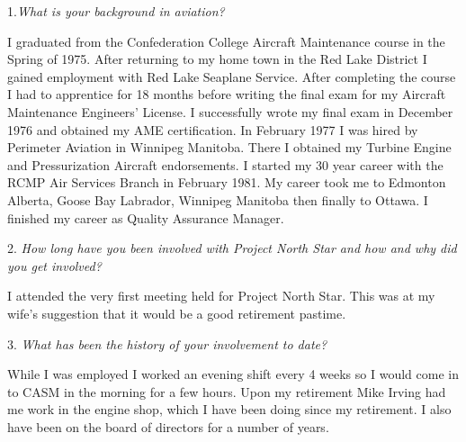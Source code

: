 \begin{multicols}{2}

1.\textit{What is your background in aviation?}

I graduated from the Confederation College Aircraft Maintenance course
in the Spring of 1975. After returning to my home town in the Red Lake
District I gained employment with Red Lake Seaplane Service. After
completing the course I had to apprentice for 18 months before writing
the final exam for my Aircraft Maintenance Engineers' License. I
successfully wrote my final exam in December 1976 and obtained my AME
certification. In February 1977 I was hired by Perimeter Aviation in
Winnipeg Manitoba. There I obtained my Turbine Engine and
Pressurization Aircraft endorsements.  I started my 30 year career with
the RCMP Air Services Branch in February 1981. My career took me to
Edmonton Alberta, Goose Bay Labrador, Winnipeg Manitoba then finally to
Ottawa. I finished my career as Quality Assurance Manager.

2. \textit{How long have you been involved with Project North Star and how and
why did you get involved?}

I attended the very first meeting held for Project North Star. This was
at my wife's suggestion that it would be a good retirement pastime.


3. \textit{What has been the history of your involvement to date?}

While I was employed I worked an evening shift every 4 weeks so I would
come in to CASM in the morning for a few hours. Upon my retirement Mike
Irving had me work in the engine shop, which I have been doing since my
retirement. I also have been on the board of directors for a number of
years.




\end{multicols}
